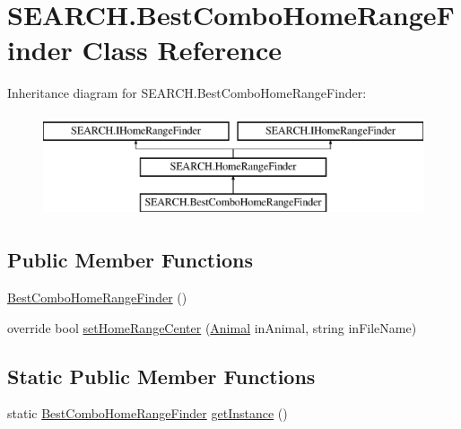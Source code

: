 \hypertarget{class_s_e_a_r_c_h_1_1_best_combo_home_range_finder}{\section{S\-E\-A\-R\-C\-H.\-Best\-Combo\-Home\-Range\-Finder Class Reference}
\label{class_s_e_a_r_c_h_1_1_best_combo_home_range_finder}
}


 


Inheritance diagram for S\-E\-A\-R\-C\-H.\-Best\-Combo\-Home\-Range\-Finder\-:\begin{figure}[H]
\begin{center}
\leavevmode
\includegraphics[height=3.000000cm]{class_s_e_a_r_c_h_1_1_best_combo_home_range_finder}
\end{center}
\end{figure}
\subsection*{Public Member Functions}
\begin{DoxyCompactItemize}
\item 
\hyperlink{class_s_e_a_r_c_h_1_1_best_combo_home_range_finder_a4869a6b145a31c5e9ce29d069fe864c9}{Best\-Combo\-Home\-Range\-Finder} ()
\item 
override bool \hyperlink{class_s_e_a_r_c_h_1_1_best_combo_home_range_finder_a3ea0071e375fca09e9116bf627e205b5}{set\-Home\-Range\-Center} (\hyperlink{class_s_e_a_r_c_h_1_1_animal}{Animal} in\-Animal, string in\-File\-Name)
\end{DoxyCompactItemize}
\subsection*{Static Public Member Functions}
\begin{DoxyCompactItemize}
\item 
static \hyperlink{class_s_e_a_r_c_h_1_1_best_combo_home_range_finder}{Best\-Combo\-Home\-Range\-Finder} \hyperlink{class_s_e_a_r_c_h_1_1_best_combo_home_range_finder_a015cb41e11c2ea98733f0d1b1be1dc70}{get\-Instance} ()
\end{DoxyCompactItemize}
